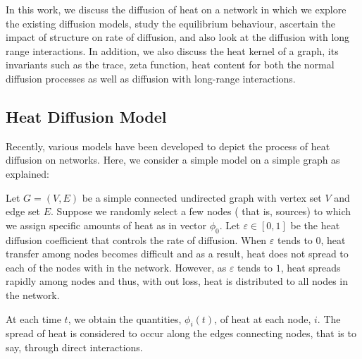 \documentclass[10pt,a4paper]{article}
\begin{document}
    In this work, we discuss the diffusion of heat on a network in which we explore the existing diffusion models, study the equilibrium behaviour, ascertain the impact of structure on rate of diffusion, and also look at the diffusion with long range interactions. In addition, we also discuss the heat kernel of a graph, its invariants such as the trace, zeta function, heat content for both the normal diffusion processes as well as diffusion with long-range interactions.
    
    \subsection{Heat Diffusion Model}
    Recently, various models have been developed to depict the process of heat diffusion on networks. Here, we consider a simple model on a simple graph as explained:
    
    
    Let $G=(V,E)$ be a simple connected undirected graph with vertex set $V$ and edge set $E$. Suppose we randomly select a few nodes ( that is, sources) to which we assign specific amounts of heat as in vector $\phi_0$. Let $\varepsilon \in [0,1]$ be the heat diffusion coefficient that controls the rate of diffusion. When $\varepsilon$ tends to $0$, heat transfer among nodes becomes difficult and as a result, heat does not spread to each of the nodes with in the network. However, as $\varepsilon$ tends to $1$, heat spreads rapidly among nodes and thus, with out loss, heat is distributed to all nodes in the network.
    
   At each time $t$, we obtain the quantities, $\phi_i(t)$, of heat at each node, $i$. The spread of heat is considered to occur along the edges connecting nodes, that is to say, through direct interactions.  
    	
\end{document}
